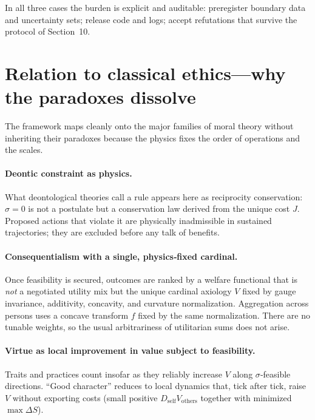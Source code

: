 \documentclass[11pt]{article}
\begin{document}
\medskip
In all three cases the burden is explicit and auditable: preregister boundary data and uncertainty sets; release code and logs; accept refutations that survive the protocol of Section~10.

\section{Relation to classical ethics—why the paradoxes dissolve}

The framework maps cleanly onto the major families of moral theory without inheriting their paradoxes because the physics fixes the order of operations and the scales.

\paragraph{Deontic constraint as physics.}
What deontological theories call a rule appears here as reciprocity conservation: $\sigma=0$ is not a postulate but a conservation law derived from the unique cost $J$. Proposed actions that violate it are physically inadmissible in sustained trajectories; they are excluded before any talk of benefits.

\paragraph{Consequentialism with a single, physics‑fixed cardinal.}
Once feasibility is secured, outcomes are ranked by a welfare functional that is \emph{not} a negotiated utility mix but the unique cardinal axiology $V$ fixed by gauge invariance, additivity, concavity, and curvature normalization. Aggregation across persons uses a concave transform $f$ fixed by the same normalization. There are no tunable weights, so the usual arbitrariness of utilitarian sums does not arise.

\paragraph{Virtue as local improvement in value subject to feasibility.}
Traits and practices count insofar as they reliably increase $V$ along $\sigma$‑feasible directions. “Good character” reduces to local dynamics that, tick after tick, raise $V$ without exporting costs (small positive $D_{\text{self}} V_{\text{others}}$ together with minimized $\max\Delta S$).
\end{document}

